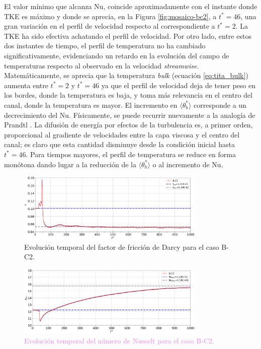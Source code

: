 El valor mínimo que alcanza Nu, coincide aproximadamente con el instante donde TKE es máximo y donde se aprecia, en la Figura \ref{fig:mosaico-bc2}, a $t^*=46$, una gran variación en el perfil de velocidad respecto al correspondiente a $t^*=2$. La TKE ha sido efectiva achatando el perfil de velocidad. Por otro lado, entre estos dos instantes de tiempo, el perfil de temperatura no ha cambiado significativamente, evidenciando un retardo en la evolución del campo de \linebreak temperaturas respecto al observado en la velocidad \textit{streamwise}. Matemáticamente, se aprecia que la temperatura \textit{bulk} (ecuación \ref{eq:tita_bulk}) aumenta entre $t^*=2$ y $t^*=46$ ya que el perfil de velocidad deja de tener peso en los bordes, donde la temperatura es baja, y toma más relevancia en el centro del canal, donde la temperatura es mayor. El incremento en $\langle \theta^*_{b} \rangle$ corresponde a un decrecimiento del Nu. Físicamente, se puede recurrir nuevamente a la analogía de Prandtl \cite{aicher1997}. La difusión de energía por efectos de la turbulencia es, a primer orden, proporcional al gradiente de velocidades entre la capa viscosa y el centro del canal; es claro que esta cantidad disminuye desde la condición inicial hasta $t^*=46$. Para tiempos mayores, el perfil de temperatura se reduce en forma monótona dando lugar a la reducción de la $\langle \theta^*_{b} \rangle$ o al incremento de Nu.



\begin{figure}[H]
  \centering  
    \includegraphics[width=0.8\textwidth]{figures/cap6/B-C2/Cases_Comp_darcy.png}
   \caption{Evolución temporal del factor de fricción de Darcy para el caso B-C2.}  
    \label{fig:darcy-bc2}
\end{figure}

\newpage

\begin{figure}[H]
  \centering  
    \includegraphics[width=0.8\textwidth]{figures/cap6/B-C2/Cases_Comp_nussel.png}
  \caption{\textcolor{violet}{Evolución temporal del número de Nusselt para el caso B-C2.}}
    \label{fig:nu-bc2}
\end{figure}

